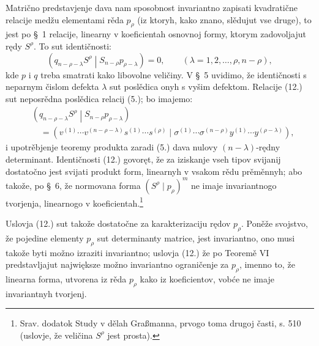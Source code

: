 \documentclass[11pt]{article}
\newcommand{\pair}[2]{\left(#1\middle|#2\right)}
\begin{document}
Matrično predstavjenje dava nam sposobnost invariantno zapisati kvadratične relacije medžu elementami rěda $p_\rho$ (iz ktoryh, kako znano, slědujut vse druge), to jest po \S\ 1 relacije, linearny v koeficientah osnovnoj formy, ktorym zadovoljajut rędy $S^\rho$. To sut identičnosti:
\begin{equation}
 \pair{q_{n-\rho-\lambda}S^\rho}{S_{n-\rho}p_{\rho-\lambda}}=0,
 \qquad (\lambda=1,2,\ldots,\rho,n-\rho),
\tag{12}
\end{equation}
kde $p$ i $q$ treba smatrati kako libovolne veličiny. V \S\ 5 uvidimo, že identičnosti s neparnym čislom defekta $\lambda$ sut poslědica onyh s vyšim defektom. Relacije (12.) sut neposrědna poslědica relacij (5.); bo imajemo:
\[
\begin{aligned}
&\pair{q_{n-\rho-\lambda}S^\rho}{S_{n-\rho}p_{\rho-\lambda}}\\
&\quad
=(v^{(1)}\cdots v^{(n-\rho-\lambda)}s^{(1)}\cdots s^{(\rho)}
\mid \sigma^{(1)}\cdots\sigma^{(n-\rho)}y^{(1)}\cdots y^{(\rho-\lambda)}),
\end{aligned}
\]
i upotrěbjenje teoremy produkta zaradi (5.) dava nulovy $(n-\lambda)$-rędny determinant. Identičnosti (12.) govoręt, že za iziskanje vseh tipov svijanij dostatočno jest svijati produkt form, linearnyh v vsakom rědu prěměnnyh; abo takože, po \S\ 6, že normovana forma $(S^\rho\mid p_\rho)^m$ ne imaje invariantnogo tvorjenja, linearnogo v koeficientah.\footnote{Srav. dodatok Study v dělah Graßmanna, prvogo toma drugoj časti, s. 510 (uslovje, že veličina $S^\rho$ jest prosta).}

Uslovja (12.) sut takože dostatočne za karakterizaciju rędov $p_\rho$. Poněže svojstvo, že pojedine elementy $p_\rho$ sut determinanty matrice, jest invariantno, ono musi takože byti možno izraziti invariantno; uslovja (12.) že po Teoremě VI predstavljajut największe možno invariantno ograničenje za $p_\rho$, imenno to, že linearna forma, utvorena iz rěda $p_\rho$ kako iz koeficientov, vobće ne imaje invariantnyh tvorjenj.
\end{document}
